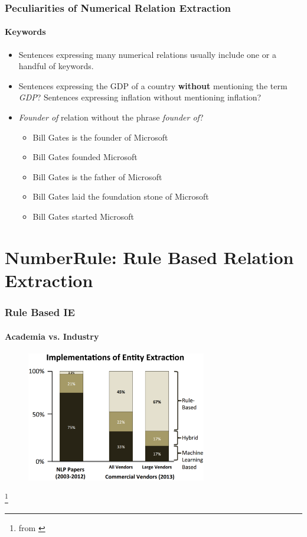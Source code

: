 \documentclass{beamer}
\begin{document}
\begin{frame}
\frametitle{Peculiarities of Numerical Relation Extraction}
\framesubtitle{Keywords}

\begin{itemize}
\setlength \itemsep{1em}
\item Sentences expressing many numerical relations usually include one or a handful of keywords.
\item Sentences expressing the GDP of a country \textbf{without} mentioning the term \textit{GDP}? Sentences expressing inflation without mentioning inflation?
\item \textit{Founder of} relation without the phrase \textit{founder of}?
\begin{itemize}
\item Bill Gates is the founder of Microsoft
\item Bill Gates founded Microsoft
\item Bill Gates is the father of Microsoft
\item Bill Gates laid the foundation stone of Microsoft
\item Bill Gates started Microsoft
\end{itemize}
\end{itemize}

\end{frame}


\section{NumberRule: Rule Based Relation Extraction}

\begin{frame}
\frametitle{Rule Based IE}
\framesubtitle{Academia vs. Industry}

\begin{figure}
\includegraphics[width=0.7\textwidth]{images/longliverulebased.eps}
\end{figure}

\footnote{from \cite{chiticariu2013rule}}

\end{frame}
\end{document}
